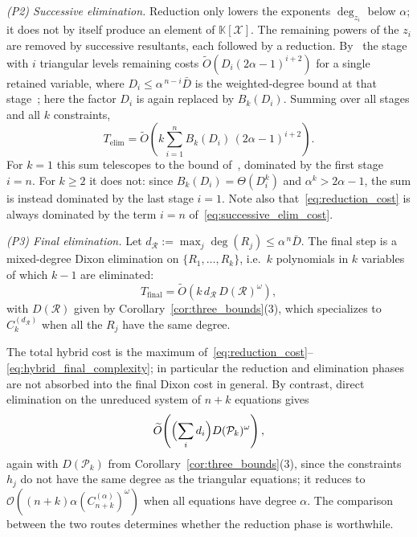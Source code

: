 \emph{(P2) Successive elimination.} Reduction only lowers the exponents $\deg_{z_i}$ below $\alpha$; it does not by itself produce an element of $\mathbb{K}[\mathcal{X}]$. The remaining powers of the $z_i$ are removed by successive resultants, each followed by a reduction. By~\cite[Lemma~2]{DBLP:conf/crypto/BariantBBHOR25} the stage with $i$ triangular levels remaining costs $\widetilde{O}(D_i(2\alpha-1)^{i+2})$ for a single retained variable, where $D_i \le \alpha^{\,n-i}\bar{D}$ is the weighted-degree bound at that stage~\cite[Lemma~3]{DBLP:conf/crypto/BariantBBHOR25}; here the factor $D_i$ is again replaced by $B_k(D_i)$. Summing over all stages and all $k$ constraints,
\begin{equation}
	T_{\text{elim}} = \widetilde{O}\!\left(k\sum_{i=1}^{n} B_k(D_i)\,(2\alpha-1)^{i+2}\right).
	\label{eq:successive_elim_cost}
\end{equation}
For $k=1$ this sum telescopes to the bound of~\cite[Proposition~7]{DBLP:conf/crypto/BariantBBHOR25}, dominated by the first stage $i=n$. For $k\ge 2$ it does not: since $B_k(D_i)=\Theta(D_i^{k})$ and $\alpha^{k}>2\alpha-1$, the sum is instead dominated by the last stage $i=1$. Note also that~\eqref{eq:reduction_cost} is always dominated by the term $i=n$ of~\eqref{eq:successive_elim_cost}.

\emph{(P3) Final elimination.} Let $d_{\mathcal{R}} := \max_j \deg(R_j)\le \alpha^{\,n}\bar{D}$. The final step is a mixed-degree Dixon elimination on $\{R_1,\ldots,R_k\}$, i.e.\ $k$ polynomials in $k$ variables of which $k-1$ are eliminated:
\begin{equation}
	T_{\text{final}} = \widetilde{O}\!\left(k\,d_{\mathcal{R}}\,D(\mathcal{R})^{\omega}\right),
	\label{eq:hybrid_final_complexity}
\end{equation}
with $D(\mathcal{R})$ given by Corollary~\ref{cor:three_bounds}(3), which specializes to $C_k^{(d_{\mathcal{R}})}$ when all the $R_j$ have the same degree.

The total hybrid cost is the maximum of~\eqref{eq:reduction_cost}--\eqref{eq:hybrid_final_complexity}; in particular the reduction and elimination phases are not absorbed into the final Dixon cost in general. By contrast, direct elimination on the unreduced system of $n+k$ equations gives
\begin{equation}
	\widetilde{O}\!\left(\Bigl(\sum_i d_i\Bigr)D(\mathcal{P}_k)^{\omega}\right),
	\label{eq:hybrid_direct_complexity}
\end{equation}
again with $D(\mathcal{P}_k)$ from Corollary~\ref{cor:three_bounds}(3), since the constraints $h_j$ do not have the same degree as the triangular equations; it reduces to $\mathcal{O}\!\left((n+k)\alpha (C_{n+k}^{(\alpha)})^{\omega}\right)$ when all equations have degree $\alpha$. The comparison between the two routes determines whether the reduction phase is worthwhile.

